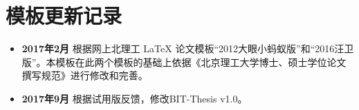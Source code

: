 \chapter{模板更新记录}
\label{chap:updatelog}
\begin{itemize}
\item \textbf{2017年2月} 根据网上北理工 \LaTeX{} 论文模板“2012大眼小蚂蚁版”和“2016汪卫版”。本模板在此两个模板的基础上依据《北京理工大学博士、硕士学位论文撰写规范》进行修改和完善。

\item \textbf{2017年9月} 根据试用版反馈，修改BIT-Thesis v1.0。
\end{itemize}
